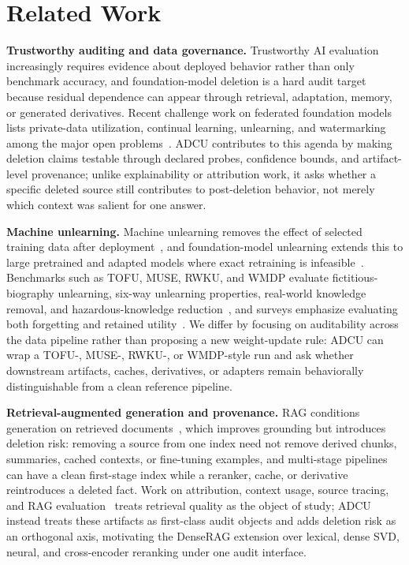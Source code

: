 \documentclass[10pt,journal,compsoc]{IEEEtran}
\newcommand{\method}{ADCU}
\begin{document}

\section{Related Work}

\textbf{Trustworthy auditing and data governance.}
Trustworthy AI evaluation increasingly requires evidence about deployed behavior rather than only benchmark accuracy, and foundation-model deletion is a hard audit target because residual dependence can appear through retrieval, adaptation, memory, or generated derivatives. Recent challenge work on federated foundation models lists private-data utilization, continual learning, unlearning, and watermarking among the major open problems~\cite{fan2025fedfmchallenges}. \method{} contributes to this agenda by making deletion claims testable through declared probes, confidence bounds, and artifact-level provenance; unlike explainability or attribution work, it asks whether a specific deleted source still contributes to post-deletion behavior, not merely which context was salient for one answer.

\textbf{Machine unlearning.}
Machine unlearning removes the effect of selected training data after deployment~\cite{cao2015machineunlearning,bourtoule2021machineunlearning,ginart2019making}, and foundation-model unlearning extends this to large pretrained and adapted models where exact retraining is infeasible~\cite{yao2024largeunlearning,liu2024rethinking}. Benchmarks such as TOFU, MUSE, RWKU, and WMDP evaluate fictitious-biography unlearning, six-way unlearning properties, real-world knowledge removal, and hazardous-knowledge reduction~\cite{maini2024tofu,shi2024muse,jin2024rwku,li2024wmdp}, and surveys emphasize evaluating both forgetting and retained utility~\cite{jin2024surveyunlearning}. We differ by focusing on auditability across the data pipeline rather than proposing a new weight-update rule: \method{} can wrap a TOFU-, MUSE-, RWKU-, or WMDP-style run and ask whether downstream artifacts, caches, derivatives, or adapters remain behaviorally distinguishable from a clean reference pipeline.

\textbf{Retrieval-augmented generation and provenance.}
RAG conditions generation on retrieved documents~\cite{lewis2020rag,karpukhin2020dpr,izacard2021fid}, which improves grounding but introduces deletion risk: removing a source from one index need not remove derived chunks, summaries, cached contexts, or fine-tuning examples, and multi-stage pipelines can have a clean first-stage index while a reranker, cache, or derivative reintroduces a deleted fact. Work on attribution, context usage, source tracing, and RAG evaluation~\cite{asai2024selfrag} treats retrieval quality as the object of study; \method{} instead treats these artifacts as first-class audit objects and adds deletion risk as an orthogonal axis, motivating the DenseRAG extension over lexical, dense SVD, neural, and cross-encoder reranking under one audit interface.
\end{document}
